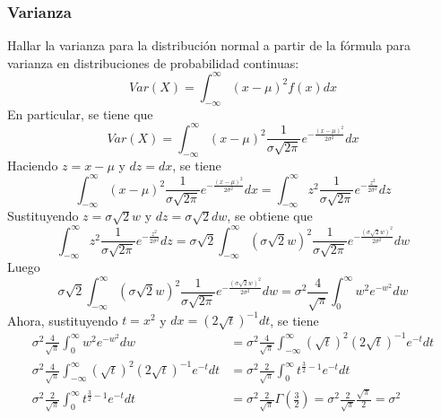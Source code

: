 \documentclass[12pt]{article}
\begin{document}
        	\subsubsection{Varianza}
        	Hallar la varianza para la distribución normal a partir de la fórmula para varianza en distribuciones de probabilidad continuas:
            \begin{equation}
            	Var(X)=\int_{-\infty }^{\infty }{\left( x-\mu  \right)^{2}f\left( x \right)dx}
            \end{equation}
            En particular, se tiene que
            \begin{equation*}
            	Var(X) = \int_{-\infty}^{\infty}(x-\mu)^2\frac{1}{\sigma\sqrt{2\pi}} e^{-\frac{(x-\mu)^2}{2\sigma^2}}dx
            \end{equation*}
			Haciendo $z = x-\mu$ y $dz = dx$, se tiene
            \begin{equation*}
            	\int_{-\infty}^{\infty}(x-\mu)^2\frac{1}{\sigma\sqrt{2\pi}} e^{-\frac{(x-\mu)^2}{2\sigma^2}}dx = \int_{-\infty}^{\infty}z^2\frac{1}{\sigma\sqrt{2\pi}} e^{-\frac{z^2}{2\sigma^2}}dz
            \end{equation*}
            Sustituyendo $z=\sigma\sqrt{2}w$ y $dz = \sigma\sqrt{2}dw$, se obtiene que
            \begin{equation*}
            	\int_{-\infty}^{\infty}z^2\frac{1}{\sigma\sqrt{2\pi}} e^{-\frac{z^2}{2\sigma^2}}dz = \sigma \sqrt{2}\int_{-\infty }^{\infty }{\left( \sigma \sqrt{2}w \right)^{2}\frac{1}{\sigma \sqrt{2\pi }}e^{-\frac{\left( \sigma \sqrt{2}w \right)^{2}}{2\sigma ^{2}}}}dw
            \end{equation*}     
            Luego
            \begin{equation*}
            	\sigma \sqrt{2}\int_{-\infty }^{\infty }{\left( \sigma \sqrt{2}w \right)^{2}\frac{1}{\sigma \sqrt{2\pi }}e^{-\frac{\left( \sigma \sqrt{2}w \right)^{2}}{2\sigma ^{2}}}}dw = \sigma ^{2}\frac{4}{\sqrt{\pi }}\int_{0}^{\infty }{w^{2}e^{-w^{2}}dw}
            \end{equation*}
            Ahora, sustituyendo $t = x^2$ y $dx = (2\sqrt{t})^{-1}dt$, se tiene
            \begin{equation*}
            	\begin{split}\sigma ^{2}\frac{4}{\sqrt{\pi }}\int_{0}^{\infty }{w^{2}e^{-w^{2}}dw} &= \sigma ^{2}\frac{4}{\sqrt{\pi }}\int_{-\infty }^{\infty }{\left( \sqrt{t} \right)^{2}\left( 2\sqrt{t} \right)^{-1}e^{-t}dt} \\
                \sigma ^{2}\frac{4}{\sqrt{\pi }}\int_{-\infty }^{\infty }{\left( \sqrt{t} \right)^{2}\left( 2\sqrt{t} \right)^{-1}e^{-t}dt} &= \sigma ^{2}\frac{2}{\sqrt{\pi }}\int_{0}^{\infty }{t^{\frac{3}{2}-1}e^{-t}dt} \\
                \sigma ^{2}\frac{2}{\sqrt{\pi }}\int_{0}^{\infty }{t^{\frac{3}{2}-1}e^{-t}dt}&=\sigma ^{2}\frac{2}{\sqrt{\pi }}\Gamma\left( \frac{3}{2} \right) = \sigma^2\frac{2}{\sqrt{\pi}} \frac{\sqrt{\pi}}{2}= \sigma^2
              	\end{split}
            \end{equation*}
\end{document}
